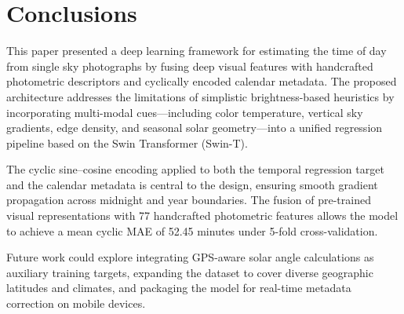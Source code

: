 \documentclass[9pt, a4paper, twocolumn]{article}
\begin{document}
\section{Conclusions}

This paper presented a deep learning framework for estimating the time of day from single sky photographs by fusing deep visual features with handcrafted photometric descriptors and cyclically encoded calendar metadata. The proposed architecture addresses the limitations of simplistic brightness-based heuristics by incorporating multi-modal cues---including color temperature, vertical sky gradients, edge density, and seasonal solar geometry---into a unified regression pipeline based on the Swin Transformer (Swin-T).

The cyclic sine--cosine encoding applied to both the temporal regression target and the calendar metadata is central to the design, ensuring smooth gradient propagation across midnight and year boundaries. The fusion of pre-trained visual representations with 77 handcrafted photometric features allows the model to achieve a mean cyclic MAE of 52.45 minutes under 5-fold cross-validation.

Future work could explore integrating GPS-aware solar angle calculations as auxiliary training targets, expanding the dataset to cover diverse geographic latitudes and climates, and packaging the model for real-time metadata correction on mobile devices.

\end{document}
